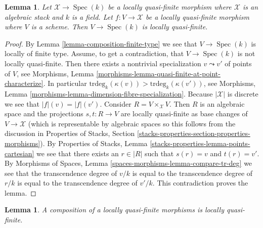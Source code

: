 \documentclass{stacks-project}
\theoremstyle{plain}
\newtheorem{lemma}[subsection]{Lemma}
\theoremstyle{definition}
\theoremstyle{remark}
\numberwithin{equation}{subsection}
\def\Spec{\mathop{\mathrm{Spec}}}
\begin{document}
\begin{lemma}
\label{lemma-locally-quasi-finite-over-field}
Let $\mathcal{X} \to \Spec(k)$ be a locally quasi-finite morphism
where $\mathcal{X}$ is an algebraic stack and $k$ is a field.
Let $f : V \to \mathcal{X}$ be a locally quasi-finite morphism where
$V$ is a scheme. Then $V \to \Spec(k)$ is locally quasi-finite.
\end{lemma}

\begin{proof}
By
Lemma \ref{lemma-composition-finite-type}
we see that $V \to \Spec(k)$ is locally of finite type.
Assume, to get a contradiction, that $V \to \Spec(k)$ is not
locally quasi-finite. Then there exists a nontrivial specialization
$v \leadsto v'$ of points of $V$, see
Morphisms, Lemma \ref{morphisms-lemma-quasi-finite-at-point-characterize}.
In particular $\text{trdeg}_k(\kappa(v)) > \text{trdeg}_k(\kappa(v'))$, see
Morphisms, Lemma \ref{morphisms-lemma-dimension-fibre-specialization}.
Because $|\mathcal{X}|$ is discrete we see that $|f|(v) = |f|(v')$.
Consider $R = V \times_\mathcal{X} V$. Then $R$ is an algebraic space
and the projections $s, t : R \to V$ are locally quasi-finite as base
changes of $V \to \mathcal{X}$ (which is representable by algebraic spaces
so this follows from the discussion in
Properties of Stacks, Section
\ref{stacks-properties-section-properties-morphisms}).
By
Properties of Stacks, Lemma \ref{stacks-properties-lemma-points-cartesian}
we see that there exists an $r \in |R|$ such that $s(r) = v$ and $t(r) = v'$.
By
Morphisms of Spaces, Lemma \ref{spaces-morphisms-lemma-compare-tr-deg}
we see that the transcendence degree of $v/k$ is equal to the
transcendence degree of $r/k$ is equal to the transcendence degree of
$v'/k$. This contradiction proves the lemma.
\end{proof}

\begin{lemma}
\label{lemma-composition-locally-quasi-finite}
A composition of a locally quasi-finite morphisms is locally quasi-finite.
\end{lemma}
\end{document}
